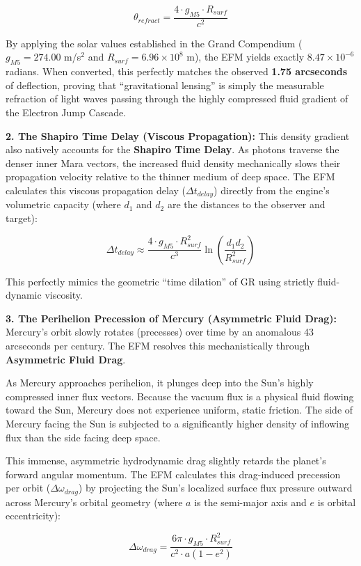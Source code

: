 \documentclass[11pt, a4paper]{article}
\begin{document}
  $$\theta_{refract} = \frac{4 \cdot g_{M5} \cdot R_{surf}}{c^2}$$

  By applying the solar values established in the Grand Compendium ($g_{M5} = 274.00$ m/s$^2$ and $R_{surf} = 6.96 \times 10^8$ m), the EFM yields exactly $8.47 \times 10^{-6}$ radians. When converted, this perfectly matches the observed \textbf{1.75 arcseconds} of deflection, proving that ``gravitational lensing'' is simply the measurable refraction of light waves passing through the highly compressed fluid gradient of the Electron Jump Cascade.

  \textbf{2. The Shapiro Time Delay (Viscous Propagation):}
  This density gradient also natively accounts for the \textbf{Shapiro Time Delay}. As photons traverse the denser inner Mara vectors, the increased fluid density mechanically slows their propagation velocity relative to the thinner medium of deep space. The EFM calculates this viscous propagation delay ($\Delta t_{delay}$) directly from the engine's volumetric capacity (where $d_1$ and $d_2$ are the distances to the observer and target):

  $$\Delta t_{delay} \approx \frac{4 \cdot g_{M5} \cdot R_{surf}^2}{c^3} \ln\left(\frac{d_1 d_2}{R_{surf}^2}\right)$$

  This perfectly mimics the geometric ``time dilation'' of GR using strictly fluid-dynamic viscosity.

  \textbf{3. The Perihelion Precession of Mercury (Asymmetric Fluid Drag):}
  Mercury's orbit slowly rotates (precesses) over time by an anomalous 43 arcseconds per century. The EFM resolves this mechanistically through \textbf{Asymmetric Fluid Drag}. 

  As Mercury approaches perihelion, it plunges deep into the Sun's highly compressed inner flux vectors. Because the vacuum flux is a physical fluid flowing toward the Sun, Mercury does not experience uniform, static friction. The side of Mercury facing the Sun is subjected to a significantly higher density of inflowing flux than the side facing deep space. 

  This immense, asymmetric hydrodynamic drag slightly retards the planet's forward angular momentum. The EFM calculates this drag-induced precession per orbit ($\Delta \omega_{drag}$) by projecting the Sun's localized surface flux pressure outward across Mercury's orbital geometry (where $a$ is the semi-major axis and $e$ is orbital eccentricity):

  $$\Delta \omega_{drag} = \frac{6\pi \cdot g_{M5} \cdot R_{surf}^2}{c^2 \cdot a(1-e^2)}$$
\end{document}

